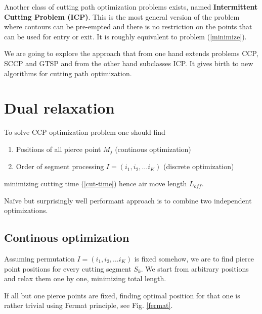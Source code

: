 \documentclass{../download/tPRS2e}
\begin{document}
Another class of cutting path optimization problems exists,
named \textbf{Intermittent Cutting Problem (ICP)}.
This is the most general version of the problem
where contours can be pre-empted and there is
no restriction on the points that can be used for entry or exit.
It is roughly equivalent to problem (\ref{minimize}).

We are going to explore the approach
that from one hand
extends problems CCP, SCCP and GTSP
and from the other hand
subclasses ICP.
It gives birth to new algorithms for
cutting path optimization.

\section{Dual relaxation}

To solve CCP optimization problem one should find
\begin{enumerate}
    \item{Positions of all pierce point $M_j$} (continous optimization)
    \item{Order of segment processing $I = (i_1, i_2, \dots i_K)$ } (discrete optimization)
\end{enumerate}
minimizing cutting time (\ref{cut-time})
hence air move length $L_{off}$.

Na\"ive but surprisingly well performant approach is to combine
two independent optimizations.

\subsection{Continous optimization}

Assuming permutation 
$I = (i_1, i_2, \dots i_K)$
is fixed somehow,
we are to find pierce point positions for every
cutting segment $S_k$.
We start from arbitrary positions
and relax them one by one,
minimizing total length.

If all but one pierce points are fixed,
finding optimal position for that one 
is rather trivial using Fermat principle,
see Fig. \ref{fermat}.
\end{document}
